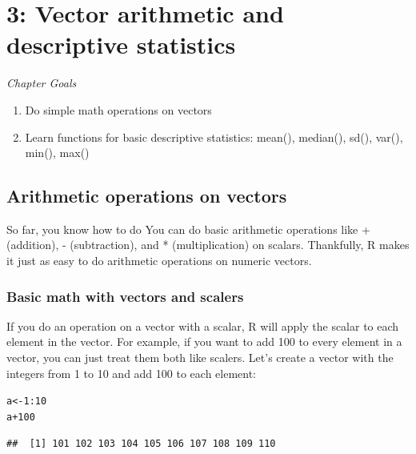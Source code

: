\documentclass{tufte-book}\usepackage[]{graphicx}\usepackage[]{color}
\makeatletter
\newcommand{\hlnum}[1]{\textcolor[rgb]{0.686,0.059,0.569}{#1}}%
\newcommand{\hlopt}[1]{\textcolor[rgb]{0,0,0}{#1}}%
\newcommand{\hlstd}[1]{\textcolor[rgb]{0.345,0.345,0.345}{#1}}%
\newcommand{\hlkwb}[1]{\textcolor[rgb]{0.69,0.353,0.396}{#1}}%
\newenvironment{kframe}{%
 \def\at@end@of@kframe{}%
 \ifinner\ifhmode%
  \def\at@end@of@kframe{\end{minipage}}%
  \begin{minipage}{\columnwidth}%
 \fi\fi%
 \def\FrameCommand##1{\hskip\@totalleftmargin \hskip-\fboxsep
 \colorbox{shadecolor}{##1}\hskip-\fboxsep
     \hskip-\linewidth \hskip-\@totalleftmargin \hskip\columnwidth}%
 \MakeFramed {\advance\hsize-\width
   \@totalleftmargin\z@ \linewidth\hsize
   \@setminipage}}%
 {\par\unskip\endMakeFramed%
 \at@end@of@kframe}
\newenvironment{knitrout}{}{} %
\makeatother
\begin{document}

\chapter{3: Vector arithmetic and descriptive statistics}
\label{ch:3}

\textit{Chapter Goals}

\begin{enumerate}
  \item Do simple math operations on vectors
  \item Learn functions for basic descriptive statistics: mean(), median(), sd(), var(), min(), max()
\end{enumerate}


\section{Arithmetic operations on vectors}

So far, you know how to do You can do basic arithmetic operations like + (addition), - (subtraction), and * (multiplication) on scalars. Thankfully, R makes it just as easy to do arithmetic operations on numeric vectors.

\subsection{Basic math with vectors and scalers}

If you do an operation on a vector with a scalar, R will apply the scalar to each element in the vector. For example, if you want to add 100 to every element in a vector, you can just treat them both like scalers. Let's create a vector with the integers from 1 to 10 and add 100 to each element:


\begin{knitrout}
\color{fgcolor}\begin{kframe}
\begin{alltt}
\hlstd{a} \hlkwb{<-} \hlnum{1}\hlopt{:}\hlnum{10}
\hlstd{a} \hlopt{+} \hlnum{100}
\end{alltt}
\begin{verbatim}
##  [1] 101 102 103 104 105 106 107 108 109 110
\end{verbatim}
\end{kframe}
\end{knitrout}
\end{document}
